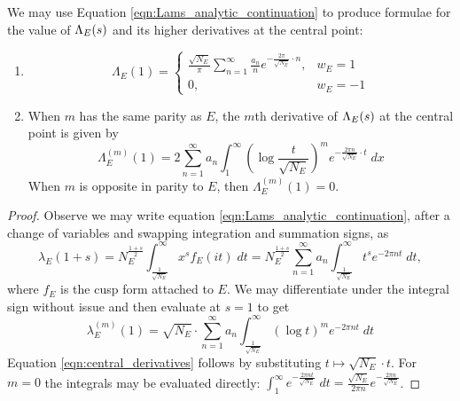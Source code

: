 We may use Equation \ref{eqn:Lams_analytic_continuation} to produce formulae for the value of $\Lambda_E(s)$ and its higher derivatives at the central point:
\begin{proposition} \mbox{}
\begin{enumerate}
\item \begin{equation}
\Lambda_E(1) = \begin{cases} \frac{\sqrt{N_E}}{\pi} \sum_{n=1}^{\infty}\frac{a_n}{n} e^{-\frac{2\pi}{\sqrt{N_E}}\cdot n}, & w_E = 1 \\ 0, & w_E = -1 \end{cases}
\end{equation}
\item When $m$ has the same parity as $E$, the $m$th derivative of $\Lambda_E(s)$ at the central point is given by
\begin{equation}\label{eqn:central_derivatives}
\Lambda_E^{(m)}(1) = 2 \sum_{n=1}^\infty a_n \int_{1}^{\infty} \left(\log \frac{t}{\sqrt{N_E}}\right)^m e^{-\frac{2\pi n}{\sqrt{N_E}}\cdot t} \; dx
\end{equation}
When $m$ is opposite in parity to $E$, then $\Lambda_E^{(m)}(1) = 0$.
\end{enumerate}
\end{proposition}

\begin{proof}
Observe we may write equation \ref{eqn:Lams_analytic_continuation}, after a change of variables and swapping integration and summation signs, as
\begin{equation*}
\lambda_E(1+s) = N_E^{\frac{1+s}{2}}  \int_{\frac{1}{\sqrt{N_E}}}^{\infty} x^s f_E(it) \; dt  = N_E^{\frac{1+s}{2}}  \sum_{n=1}^\infty a_n \int_{\frac{1}{\sqrt{N_E}}}^{\infty} t^s e^{-2\pi nt} \; dt,
\end{equation*}
where $f_E$ is the cusp form attached to $E$. We may differentiate under the integral sign without issue and then evaluate at $s=1$ to get
\begin{equation}\label{eqn:lambda_derivs}
\lambda_E^{(m)}(1) = \sqrt{N_E}\cdot \sum_{n=1}^\infty a_n \int_{\frac{1}{\sqrt{N_E}}}^{\infty} (\log t)^m e^{-2\pi n t} \; dt
\end{equation}
Equation \ref{eqn:central_derivatives} follows by substituting $t \mapsto \sqrt{N_E} \cdot t$. For $m=0$ the integrals may be evaluated directly: $\int_{1}^{\infty} e^{-\frac{2\pi n t}{\sqrt{N_E}}} \; dt = \frac{\sqrt{N_E}}{2\pi n} e^{-\frac{2\pi n}{\sqrt{N_E}}}$.
\end{proof}


